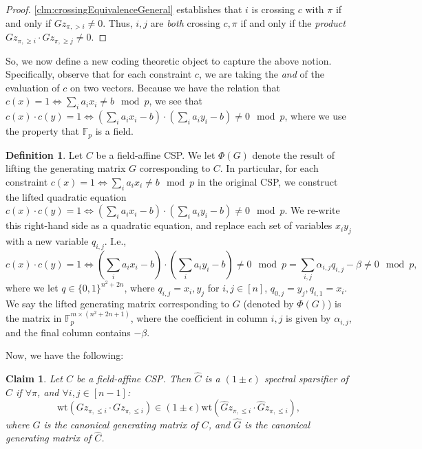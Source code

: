 \documentclass[11pt]{article}
\newtheorem{claim}[theorem]{Claim}
\theoremstyle{definition}
\newtheorem{definition}{Definition}[section]
\newcommand{\F}{\mathbb{F}}
\newcommand{\zo}{\{0, 1\}}
\newcommand{\eps}{\epsilon}
\newcommand{\wt}{\mathrm{wt}}
\begin{document}
\begin{proof}
	\cref{clm:crossingEquivalenceGeneral} establishes that $i$ is crossing $c$ with $\pi$ if and only if $G z_{\pi, > i} \neq 0$. Thus, $i, j$ are \emph{both} crossing $c, \pi$ if and only if the \emph{product} $G z_{\pi, \geq i} \cdot G z_{\pi, \geq j} \neq 0$.
\end{proof}

So, we now define a new coding theoretic object to capture the above notion. Specifically, observe that for each constraint $c$, we are taking the \emph{and} of the evaluation of $c$ on two vectors. Because we have the relation that $c(x) = 1 \iff \sum_{i} a_i x_i \neq b \mod p$, we see that $c(x) \cdot c(y) =1 \iff (\sum_{i} a_i x_i - b) \cdot (\sum_{i} a_i y_i -b) \neq 0 \mod p$, where we use the property that $\F_p$ is a field.  

\begin{definition}\label{def:liftedGeneratingGeneral}
Let $C$ be a field-affine CSP. We let $\Phi(G)$ denote the result of lifting the generating matrix $G$ corresponding to $C$. In particular, for each constraint $c(x) = 1 \iff \sum_{i} a_i x_i \neq b \mod p$ in the original CSP, we construct the lifted quadratic equation $c(x) \cdot c(y) =1 \iff (\sum_{i} a_i x_i - b) \cdot (\sum_{i} a_i y_i -b) \neq 0 \mod p$. We re-write this right-hand side as a quadratic equation, and replace each set of variables $x_i y_j$ with a new variable $q_{i,j}$. I.e.,
\[
c(x) \cdot c(y) =1 \iff (\sum_{i} a_i x_i - b) \cdot (\sum_{i} a_i y_i -b) \neq 0 \mod p = \sum_{i,j} \alpha_{i,j} q_{i,j} - \beta \neq 0 \mod p,
\]
where we let $q\in\zo^{n^2 + 2n}$, where $q_{i,j}  = x_i, y_j$ for $i, j \in [n]$, $q_{0, j} = y_j, q_{i, 1} = x_i$.
We say the lifted generating matrix corresponding to $G$ (denoted by $\Phi(G)$) is the matrix in $\F_p^{m \times (n^2+2n + 1)}$, where the coefficient in column $i,j$ is given by $\alpha_{i,j}$, and the final column contains $- \beta$.
\end{definition}

Now, we have the following:

\begin{claim}\label{clm:preserveAndWeightsGeneral}
	Let $C$ be a field-affine CSP. Then $\hat{C}$ is a $(1 \pm \eps)$ spectral sparsifier of $C$ if $\forall \pi$, and $\forall i, j \in [n-1]$:
	\[
	\wt(Gz_{\pi, \leq i} \cdot Gz_{\pi, \leq i}) \in (1 \pm \eps) \wt(\hat{G}z_{\pi, \leq i} \cdot \hat{G}z_{\pi, \leq i}),
	\]
	where $G$ is the canonical generating matrix of $C$, and $\hat{G}$ is the canonical generating matrix of $\hat{C}$.
\end{claim}
\end{document}
